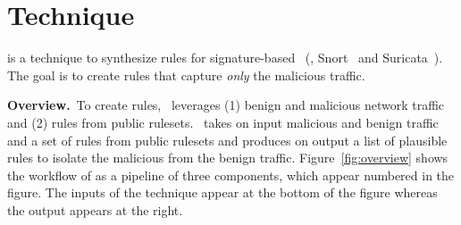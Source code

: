 \documentclass[sigconf,review, anonymous]{acmart}
\begin{document}

\section{Technique}
\label{sec:technique}

\tname{} is a technique to synthesize rules for signature-based
\nids~(\eg{}, Snort~\cite{snort} and Suricata~\cite{suricata}). The
goal is to create rules that capture \emph{only} the
malicious traffic.

\vspace{1ex}
\noindent\textbf{Overview.}~To create rules, \tname\ leverages (1)
benign and malicious network traffic and (2) rules from public
rulesets. \tname\ takes on input malicious and benign traffic and a
set of rules from public rulesets and produces on output a list of
plausible rules to isolate the malicious from the benign
traffic. Figure~\ref{fig:overview} shows the workflow of \tname{} as a
pipeline of three components, which appear numbered in the figure.
The inputs of the technique appear at the bottom of the figure whereas
the output appears at the right.
\end{document}
